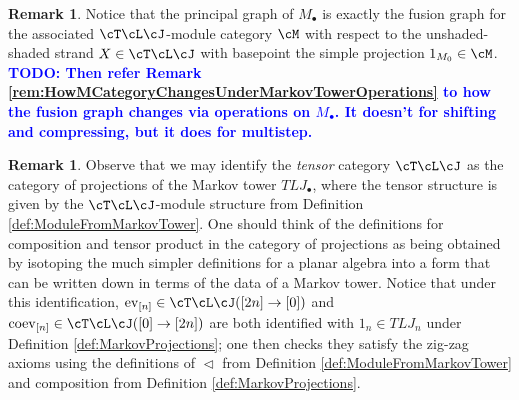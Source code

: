\documentclass[11pt]{article}
\theoremstyle{plain}
\theoremstyle{definition}
\newtheorem{rem}[thm]{Remark}
\DeclareMathOperator{\coev}{coev}
\DeclareMathOperator{\End}{End}
\DeclareMathOperator{\ev}{ev}
\DeclareMathOperator{\Obj}{Obj}
\newcommand{\todo}[1]{\textcolor{blue}{\textbf{TODO: #1}}}
\newcommand{\TLJ}{\cT\cL\cJ}
\begin{document}
\begin{rem}
Notice that the principal graph of $M_\bullet$ is exactly the fusion graph for the associated $\cT\cL\cJ$-module category $\cM$ with respect to the unshaded-shaded strand $X\in \cT\cL\cJ$ with basepoint the simple projection $1_{M_0}\in \cM$.
\todo{
Then refer Remark \ref{rem:HowMCategoryChangesUnderMarkovTowerOperations} to how the fusion graph changes via operations on $M_\bullet$.
It doesn't for shifting and compressing, but it does for multistep.
}
\end{rem}

\begin{rem}
 \label{rem:TLAsCatOfProjections}
Observe that we may identify the \emph{tensor} category $\TLJ$ as the category of projections of the Markov tower ${TLJ}_\bullet$, where the tensor structure is given by the $\TLJ$-module structure from Definition \ref{def:ModuleFromMarkovTower}. 
 One should think of the definitions for composition and tensor product in the category of projections as being obtained by isotoping the much simpler definitions for a planar algebra into a form that can be written down in terms of the data of a Markov tower. 
 Notice that under this identification, $\ev_{[n]}\in\cT\cL\cJ([2n]\to[0])$ and $\coev_{[n]}\in\cT\cL\cJ([0]\to[2n])$ are both identified with $1_n\in TLJ_n$ under Definition \ref{def:MarkovProjections}; one then checks they satisfy the zig-zag axioms using the definitions of $\vartriangleleft$ from Definition \ref{def:ModuleFromMarkovTower} and composition from Definition \ref{def:MarkovProjections}.
\end{rem}
\end{document}
